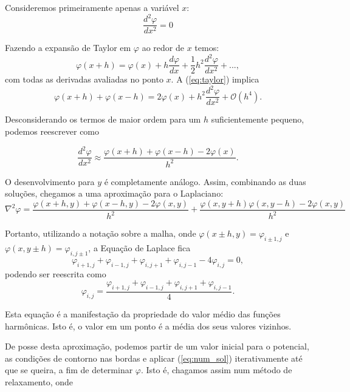 \documentclass[a4paper,12pt]{article}
\begin{document}
Consideremos primeiramente apenas a variável $x$:
\begin{equation*}
  \frac{d^2\varphi}{dx^2} = 0
\end{equation*}

Fazendo a expansão de Taylor em $\varphi$ ao redor de $x$ temos:
\begin{equation}
  \varphi(x + h) = \varphi(x)+h\frac{d\varphi}{dx}+\frac{1}{2}h^2\frac{d^2\varphi}{dx^2}+...,
  \label{eq:taylor}
\end{equation}
com todas as derivadas avaliadas no ponto $x$. A (\ref{eq:taylor}) implica
\begin{equation*}
  \varphi(x + h) + \varphi(x - h) = 2\varphi(x)+h^2\frac{d^2\varphi}{dx^2}+\mathcal{O}(h^4).
\end{equation*}

Desconsiderando os termos de maior ordem para um $h$ suficientemente pequeno, podemos reescrever como

\begin{equation}
  \frac{d^2\varphi}{dx^2} \approx \frac{\varphi(x+h)+\varphi(x-h)-2\varphi(x)}{h^2}.
\end{equation}

O desenvolvimento para $y$ é completamente análogo. Assim, combinando as duas soluções, chegamos a uma aproximação para o Laplaciano:
\begin{equation}
  \nabla^2 \varphi = \frac{\varphi(x+h,y)+\varphi(x-h,y)-2\varphi(x,y)}{h^2} +
  \frac{\varphi(x,y+h)\varphi(x,y-h)-2\varphi(x,y)}{h^2}
\end{equation}

Portanto, utilizando a notação sobre a malha, onde $\varphi(x\pm h, y)=\varphi_{i\pm 1,j}$ e $\varphi(x,y\pm h)=\varphi_{i,j\pm 1}$, a Equação de Laplace fica
\begin{equation*}
  \varphi_{i+1, j}+\varphi_{i-1,j}+\varphi_{i,j+1}+\varphi_{i,j-1}-4\varphi_{i,j}=0,
\end{equation*}
podendo ser reescrita como
\begin{equation}
  \varphi_{i,j} = \frac{\varphi_{i+1,j}+\varphi_{i-1,j}+\varphi_{i,j+1}+\varphi_{i,j-1}}{4}.
  \label{eq:num_sol}
\end{equation}

Esta equação é a manifestação da propriedade do valor médio das funções harmônicas. Isto é, o valor em um ponto é a média dos seus valores vizinhos.

De posse desta aproximação, podemos partir de um valor inicial para o potencial, as condições de contorno nas bordas e aplicar (\ref{eq:num_sol}) iterativamente até que se queira, a fim de determinar $\varphi$. Isto é, chagamos assim num método de relaxamento, onde
\end{document}
